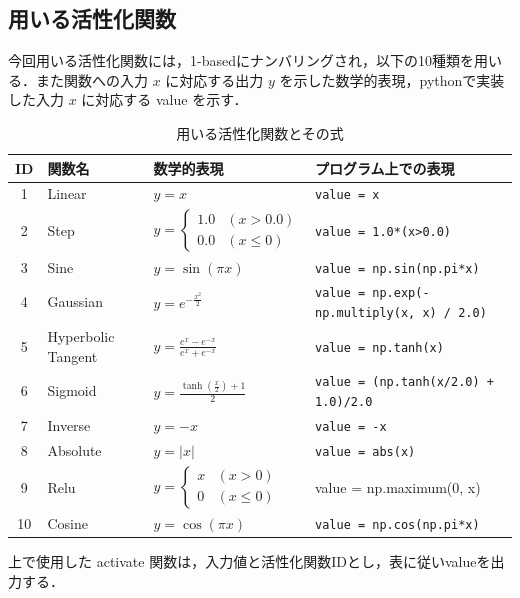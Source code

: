 \clearpage
\subsection{用いる活性化関数}
今回用いる活性化関数には，1-basedにナンバリングされ，以下の10種類を用いる．また関数への入力 $ x $ に対応する出力 $ y $ を示した数学的表現，pythonで実装した入力 $ x $ に対応する value を示す．

\begin{table}[H]
    \caption{用いる活性化関数とその式}
    \centering
    \begin{tabular}{clll}
        \hline
        ID & 関数名 & 数学的表現 & プログラム上での表現 \\
        \hline \hline
        1 & Linear & $ y = x $ & \texttt{value = x} \\
        2 & Step & $ y = \begin{cases}
            1.0 & (x > 0.0) \\
            0.0 & (x \leq 0)
            \end{cases} $ & \texttt{value = 1.0*(x>0.0)} \\
        3 & Sine & $ y = \sin(\pi x) $ & \texttt{value = np.sin(np.pi*x)} \\
        4 & Gaussian & $ y = e^{-\frac{x^2}{2}} $ & \texttt{value = np.exp(-np.multiply(x, x) / 2.0)} \\
        5 & Hyperbolic Tangent & $ y = \frac{e^{x} - e^{-x}}{e^{x} + e^{-x}} $ & \texttt{value = np.tanh(x)} \\
        6 & Sigmoid & $ y = \frac{\tanh\left(\frac{x}{2}\right) + 1}{2} $ & \texttt{value = (np.tanh(x/2.0) + 1.0)/2.0} \\
        7 & Inverse & $ y = -x $ & \texttt{value = -x} \\
        8 &Absolute & $ y = |x| $ & \texttt{value = abs(x)} \\
        9 & Relu & $ y = 
        \begin{cases}
        x & (x > 0)\\
        0 & (x \leq 0)
        \end{cases} $ & value = np.maximum(0, x) \\
        10 & Cosine & $ y = \cos(\pi x) $ & \texttt{value = np.cos(np.pi*x)} \\
        \hline
    \end{tabular}
\end{table}

上で使用した activate 関数は，入力値と活性化関数IDとし，表に従いvalueを出力する．

